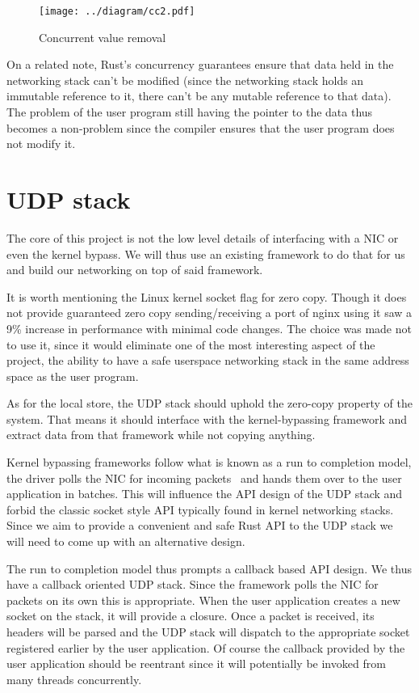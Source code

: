 \documentclass[11pt]{book}
\newcommand{\marios}[1]{\noindent{{\bf \fbox{MK:} {\textcolor{green}{\it#1}}}}}
\begin{document}
\begin{figure}[htb!]
  \texttt{[image: ../diagram/cc2.pdf]}
  \caption{Concurrent value removal}
  \label{fig:cc2}
\end{figure}

On a related note, Rust's concurrency guarantees ensure that data held
in the networking stack can't be modified (since the networking stack
holds an immutable reference to it, there can't be any mutable
reference to that data). The problem of the user program still having
the pointer to the data thus becomes a non-problem since the compiler
ensures that the user program does not modify it.

\marios{Follow the top-down design you started with. Talk about the kv-store next, R2P2, and then UDP.}

\section{UDP stack} \label{sec:udp-design}

The core of this project is not the low level details of interfacing
with a NIC or even the kernel bypass. We will thus use an existing
framework to do that for us and build our networking on top of said
framework.

It is worth mentioning the Linux kernel socket flag for zero copy.
Though it does not provide guaranteed zero copy sending/receiving a
port of nginx using it saw a 9\% increase in performance with minimal
code changes. The choice was made not to use it, since it would
eliminate one of the most interesting aspect of the project, the
ability to have a safe userspace networking stack in the same address
space as the user program.

As for the local store, the UDP stack should uphold the zero-copy
property of the system. That means it should interface with the
kernel-bypassing framework and extract data from that framework while
not copying anything.

Kernel bypassing frameworks follow what is known as a run to
completion model, the driver polls the NIC for incoming
packets~\cite{dpdk-pmd} and hands them over to the user application in
batches. This will influence the API design of the UDP stack and
forbid the classic socket style API typically found in kernel
networking stacks. Since we aim to provide a convenient and safe Rust
API to the UDP stack we will need to come up with an alternative
design.

The run to completion model thus prompts a callback based API
design. We thus have a callback oriented UDP stack. Since the
framework polls the NIC for packets on its own this is
appropriate. When the user application creates a new socket on the
stack, it will provide a closure. Once a packet is received, its
headers will be parsed and the UDP stack will dispatch to the
appropriate socket registered earlier by the user application. Of
course the callback provided by the user application should be
reentrant since it will potentially be invoked from many threads
concurrently.
\end{document}

